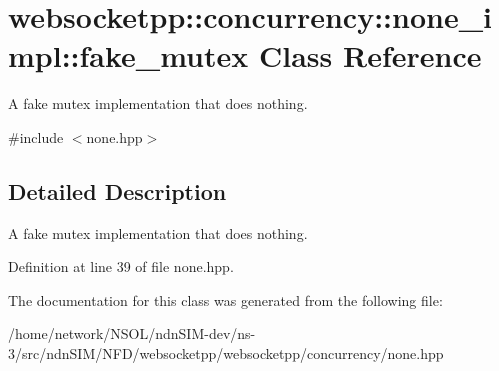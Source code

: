\hypertarget{classwebsocketpp_1_1concurrency_1_1none__impl_1_1fake__mutex}{}\section{websocketpp\+:\+:concurrency\+:\+:none\+\_\+impl\+:\+:fake\+\_\+mutex Class Reference}
\label{classwebsocketpp_1_1concurrency_1_1none__impl_1_1fake__mutex}


A fake mutex implementation that does nothing.  




{\ttfamily \#include $<$none.\+hpp$>$}



\subsection{Detailed Description}
A fake mutex implementation that does nothing. 

Definition at line 39 of file none.\+hpp.



The documentation for this class was generated from the following file\+:\begin{DoxyCompactItemize}
\item 
/home/network/\+N\+S\+O\+L/ndn\+S\+I\+M-\/dev/ns-\/3/src/ndn\+S\+I\+M/\+N\+F\+D/websocketpp/websocketpp/concurrency/none.\+hpp\end{DoxyCompactItemize}
